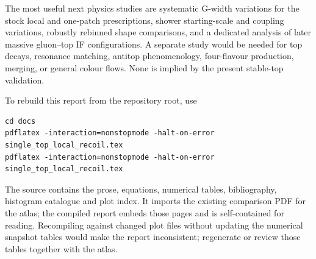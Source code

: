 \documentclass[11pt,a4paper]{article}
\begin{document}
The most useful next physics studies are systematic G-width variations
for the stock local and one-patch prescriptions, shower starting-scale and
coupling variations, robustly rebinned shape comparisons, and a dedicated
analysis of later massive gluon--top IF configurations. A separate study
would be needed for top decays, resonance matching, antitop phenomenology,
four-flavour production, merging, or general colour flows. None is implied
by the present stable-top validation.

To rebuild this report from the repository root, use
\begin{lstlisting}
cd docs
pdflatex -interaction=nonstopmode -halt-on-error single_top_local_recoil.tex
pdflatex -interaction=nonstopmode -halt-on-error single_top_local_recoil.tex
\end{lstlisting}
The source contains the prose, equations, numerical tables, bibliography,
histogram catalogue and plot index. It imports the existing comparison PDF
for the atlas; the compiled report embeds those pages and is self-contained
for reading. Recompiling against changed plot files without updating the
numerical snapshot tables would make the report inconsistent; regenerate
or review those tables together with the atlas.
\end{document}
